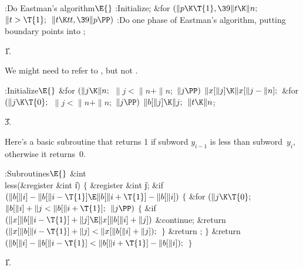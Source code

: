 \Y\B\4:Do Eastman's algorithm\X${}\E{}$\6
:Initialize\X;\6
\&{for} ${}(\|p\K\T{1},\39\|t\K\|n;{}$ ${}\|t>\T{1};{}$ ${}\|t\K\\{tt},\39\|p%
\PP){}$\1\5
:Do one phase of Eastman's algorithm, putting  boundary points
into \X;\2\par
\U1.\fi

We might need to refer to , but not .

\Y\B\4:Initialize\X${}\E{}$\6
\&{for} ${}(\|j\K\|n;{}$ ${}\|j<\|n+\|n;{}$ ${}\|j\PP){}$\1\5
${}\|x[\|j]\K\|x[\|j-\|n];{}$\2\6
\&{for} ${}(\|j\K\T{0};{}$ ${}\|j<\|n+\|n;{}$ ${}\|j\PP){}$\1\5
${}\|b[\|j]\K\|j;{}$\2\6
${}\|t\K\|n{}$;\par
\U3.\fi

Here's a basic subroutine that returns 1 if subword $y_{i-1}$ is less than
subword~$y_i$, otherwise it returns~0.

\Y\B\4:Subroutines\X${}\E{}$\6
\&{int} \\{less}(\&{register} \&{int} \|i)\1\1\2\2\6
${}\{{}$\1\6
\&{register} \&{int} \|j;\7
\&{if} ${}(\|b[\|i]-\|b[\|i-\T{1}]\E\|b[\|i+\T{1}]-\|b[\|i]){}$\5
${}\{{}$\1\6
\&{for} ${}(\|j\K\T{0};{}$ ${}\|b[\|i]+\|j<\|b[\|i+\T{1}];{}$ ${}\|j\PP){}$\5
${}\{{}$\1\6
\&{if} ${}(\|x[\|b[\|i-\T{1}]+\|j]\E\|x[\|b[\|i]+\|j]){}$\1\5
\&{continue};\2\6
\&{return} ${}(\|x[\|b[\|i-\T{1}]+\|j]<\|x[\|b[\|i]+\|j]);{}$\6
\4${}\}{}$\2\6
\&{return} ;\6
\4${}\}{}$\2\6
\&{return} ${}(\|b[\|i]-\|b[\|i-\T{1}]<\|b[\|i+\T{1}]-\|b[\|i]);{}$\6
\4${}\}{}$\2\par
\U1.\fi

